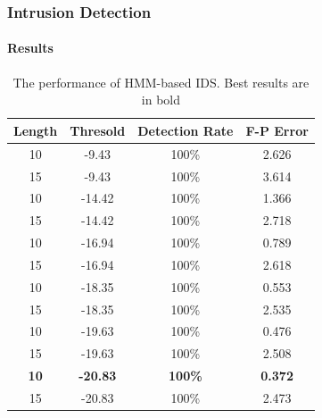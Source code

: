 \documentclass{beamer}
\begin{document}
\begin{frame}
  \frametitle{Intrusion Detection}
  \framesubtitle{Results}
  \begin{table}[h]
    \centering
    \caption{\label{tab:IDS}The performance of HMM-based IDS. Best
      results are in bold}
    \begin{tabular}{|c |c | c | c |}
      \hline
      Length & Thresold & Detection Rate & F-P Error \\ \hline
      10 & -9.43 & 100\% & 2.626 \\ \hline
      15 & -9.43 & 100\% & 3.614 \\ \hline
      10 & -14.42 & 100\% & 1.366 \\ \hline
      15 & -14.42 & 100\% & 2.718 \\ \hline
      10 & -16.94 & 100\% & 0.789 \\ \hline
      15 & -16.94 & 100\% & 2.618 \\ \hline
      10 & -18.35 & 100\% & 0.553 \\ \hline
      15 & -18.35 & 100\% & 2.535 \\ \hline
      10 & -19.63 & 100\% & 0.476 \\ \hline
      15 & -19.63 & 100\% & 2.508 \\ \hline
      \textbf{10} & \textbf{-20.83} & \textbf{100\%} & \textbf{0.372}
      \\ \hline
      15 & -20.83 & 100\% & 2.473 \\ \hline
    \end{tabular}
  \end{table}    
\end{frame}
\end{document}
